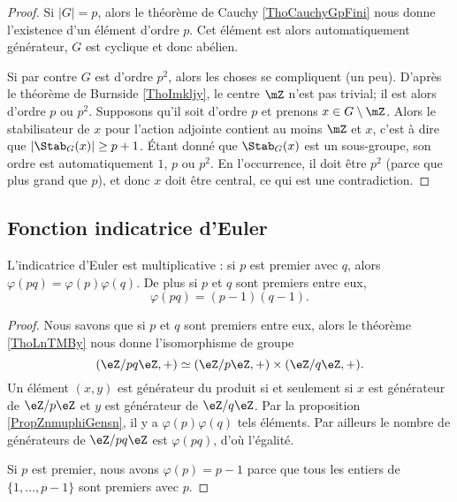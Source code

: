 \begin{proof}
    Si \( | G |=p\), alors le théorème de Cauchy \ref{ThoCauchyGpFini} nous donne l'existence d'un élément d'ordre \( p\). Cet élément est alors automatiquement générateur, \( G\) est cyclique et donc abélien.

    Si par contre \( G\) est d'ordre \( p^2\), alors les choses se compliquent (un peu). D'après le théorème de Burnside \ref{ThoImkljy}, le centre \( \mZ\) n'est pas trivial; il est alors d'ordre \( p\) ou \( p^2\). Supposons qu'il soit d'ordre \( p\) et prenons \( x\in G\setminus\mZ\). Alors le stabilisateur de \( x\) pour l'action adjointe contient au moins \( \mZ\) et \( x\), c'est à dire que \( |\Stab_G(x)|\geq p+1\). Étant donné que \( \Stab_G(x)\) est un sous-groupe, son ordre est automatiquement \( 1\), \( p\) ou \( p^2\). En l'occurrence, il doit être \( p^2\) (parce que plus grand que \( p\)), et donc \( x\) doit être central, ce qui est une contradiction.
\end{proof}


\subsection{Fonction indicatrice d'Euler}
\label{subSecKGDFooAbETjs}

\begin{corollary}       \label{CorlvTmsf}
    L'indicatrice d'Euler est multiplicative : si \( p\) est premier avec \( q\), alors \( \varphi(pq)=\varphi(p)\varphi(q)\). De plus si \( p\) et \( q\) sont premiers entre eux,
    \begin{equation}
        \varphi(pq)=(p-1)(q-1).
    \end{equation}
\end{corollary}

\begin{proof}
    Nous savons que si \( p\) et \( q\) sont premiers entre eux, alors le théorème \ref{ThoLnTMBy} nous donne l'isomorphisme de groupe
    \begin{equation}
        (\eZ/pq\eZ,+)\simeq(\eZ/p\eZ,+)\times(\eZ/q\eZ,+).
    \end{equation}
    Un élément \( (x,y)\) est générateur du produit si et seulement si \( x\) est générateur de \( \eZ/p\eZ\) et \( y\) est générateur de \( \eZ/q\eZ\). Par la proposition \ref{PropZnmuphiGensn}, il y a \( \varphi(p)\varphi(q)\) tels éléments. Par ailleurs le nombre de générateurs de \( \eZ/pq\eZ\) est \( \varphi(pq)\), d'où l'égalité.

    Si \( p\) est premier, nous avons \( \varphi(p)=p-1\) parce que tous les entiers de \( \{ 1,\ldots, p-1 \}\) sont premiers avec \( p\).
\end{proof}

